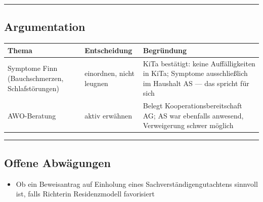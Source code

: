 \documentclass[
  11pt,
  a4paper,
]{article}
\newcounter{none}
\providecommand{\tightlist}{%
  \setlength{\itemsep}{0pt}\setlength{\parskip}{0pt}}
\begin{document}
\begin{center}\rule{0.5\linewidth}{0.5pt}\end{center}

\subsection{Argumentation}\label{argumentation}

{\def\LTcaptype{none} %
\begin{longtable}[]{@{}
  >{\raggedright\arraybackslash}p{}
  >{\raggedright\arraybackslash}p{}
  >{\raggedright\arraybackslash}p{}@{}}
\toprule\noalign{}
\begin{minipage}[b]{\linewidth}\raggedright
Thema
\end{minipage} & \begin{minipage}[b]{\linewidth}\raggedright
Entscheidung
\end{minipage} & \begin{minipage}[b]{\linewidth}\raggedright
Begründung
\end{minipage} \\
\midrule\noalign{}
\endhead
\bottomrule\noalign{}
\endlastfoot
Symptome Finn (Bauchschmerzen, Schlafstörungen) & einordnen, nicht
leugnen & KiTa bestätigt: keine Auffälligkeiten in KiTa; Symptome
ausschließlich im Haushalt AS --- das spricht für sich \\
AWO-Beratung & aktiv erwähnen & Belegt Kooperationsbereitschaft AG; AS
war ebenfalls anwesend, Verweigerung schwer möglich \\
\end{longtable}
}

\begin{center}\rule{0.5\linewidth}{0.5pt}\end{center}

\subsection{Offene Abwägungen}\label{offene-abwuxe4gungen}

\begin{itemize}
\tightlist
\item
  Ob ein Beweisantrag auf Einholung eines Sachverständigengutachtens
  sinnvoll ist, falls Richterin Residenzmodell favorisiert
\end{itemize}
\end{document}
